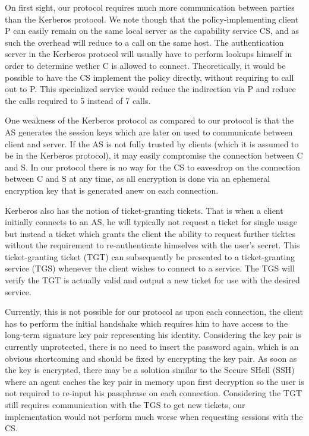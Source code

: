 On first sight, our protocol requires much more communication between parties than the Kerberos protocol.
We note though that the policy-implementing client P can easily remain on the same local server as the capability service CS, and as such the overhead will reduce to a call on the same host.
The authentication server in the Kerberos protocol will usually have to perform lookups himself in order to determine wether C is allowed to connect.
Theoretically, it would be possible to have the CS implement the policy directly, without requiring to call out to P.
This specialized service would reduce the indirection via P and reduce the calls required to 5 instead of 7 calls.

One weakness of the Kerberos protocol as compared to our protocol is that the AS generates the session keys which are later on used to communicate between client and server.
If the AS is not fully trusted by clients (which it is assumed to be in the Kerberos protocol), it may easily compromise the connection between C and S.
In our protocol there is no way for the CS to eavesdrop on the connection between C and S at any time, as all encryption is done via an ephemeral encryption key that is generated anew on each connection.

\bigskip

Kerberos also has the notion of ticket-granting tickets.
That is when a client initially connects to an AS, he will typically not request a ticket for single usage but instead a ticket which grants the client the ability to request further ticktes without the requirement to re-authenticate himselves with the user's secret.
This ticket-granting ticket (TGT) can subsequently be presented to a ticket-granting service (TGS) whenever the client wishes to connect to a service.
The TGS will verify the TGT is actually valid and output a new ticket for use with the desired service.

Currently, this is not possible for our protocol as upon each connection, the client has to perform the initial handshake which requires him to have access to the long-term signature key pair representing his identity.
Considering the key pair is currently unprotected, there is no need to insert the password again, which is an obvious shortcoming and should be fixed by encrypting the key pair.
As soon as the key is encrypted, there may be a solution similar to the Secure SHell (SSH) where an agent caches the key pair in memory upon first decryption so the user is not required to re-input his passphrase on each connection.
Considering the TGT still requires communication with the TGS to get new tickets, our implementation would not perform much worse when requesting sessions with the CS.

